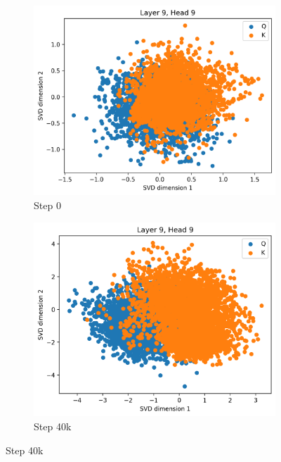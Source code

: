 \begin{figure}[ht]
    \centering
    \begin{subfigure}[b]{0.24\linewidth}
         \includegraphics[width=\linewidth]{sources/part_1/anisotropy/imgs/dist_l9h9_s0_K.png}
         \caption{Step 0}
         \label{fig:dist_qk_s0_K}
    \end{subfigure}
    \begin{subfigure}[b]{0.24\linewidth}
         \includegraphics[width=\linewidth]{sources/part_1/anisotropy/imgs/dist_l9h9_s40_K.png}
         \caption{Step 40k}
         \label{fig:dist_qk_s40_K}
    \end{subfigure}

\end{figure}

